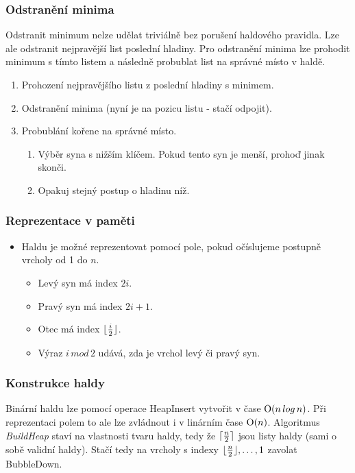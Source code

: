     \subsubsection{Odstranění minima}
      Odstranit minimum nelze udělat triviálně bez porušení haldového pravidla. Lze ale odstranit nejpravější list poslední hladiny.
      Pro odstranění minima lze prohodit minimum s tímto listem a následně probublat list na správné místo v haldě.

      \begin{enumerate}
        \item Prohození nejpravějšího listu z poslední hladiny s minimem.
        \item Odstranění minima (nyní je na pozicu listu - stačí odpojit).
        \item Probublání kořene na správné místo.
        \begin{enumerate}
          \item Výběr syna s nižším klíčem. Pokud tento syn je menší, prohoď jinak skonči.
          \item Opakuj stejný postup o hladinu níž.
        \end{enumerate}
      \end{enumerate}

    \subsubsection{Reprezentace v paměti}
    \begin{itemize}
      \item Haldu je možné reprezentovat pomocí pole, pokud očíslujeme postupně vrcholy od 1 do $n$.
      \begin{itemize}
        \item Levý syn má index $2i$.
        \item Pravý syn má index $2i + 1$.
        \item Otec má index $\lfloor\frac{i}{2}\rfloor$.
        \item Výraz $i \, mod \, 2$ udává, zda je vrchol levý či pravý syn.
      \end{itemize}
    \end{itemize}

    \subsubsection{Konstrukce haldy}
      Binární haldu lze pomocí operace HeapInsert vytvořit v čase $\textrm O(n \, log \, n)$.
      Při reprezentaci polem to ale lze zvládnout i v linárním čase $\textrm O(n)$.
      Algoritmus \emph{BuildHeap} staví na vlastnosti tvaru haldy, tedy že $\lceil\frac{n}{2}\rceil$ jsou listy haldy (sami o sobě validní haldy).
      Stačí tedy na vrcholy s indexy $\lfloor\frac{n}{2}\rfloor, \dots, 1$ zavolat BubbleDown.

